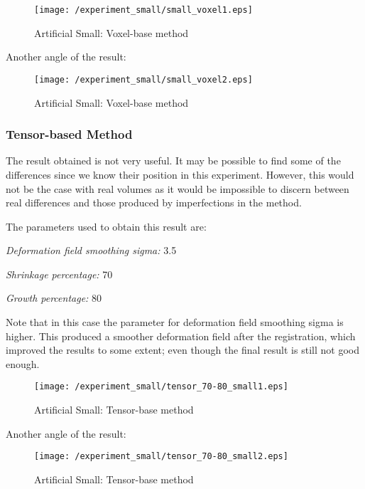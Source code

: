 \begin{figure}[H]
  \centering
  \texttt{[image: /experiment\_small/small\_voxel1.eps]}
  \caption{Artificial Small: Voxel-base method}
  \label{voxel_small1}
\end{figure}

Another angle of the result:

\begin{figure}[H]
  \centering
  \texttt{[image: /experiment\_small/small\_voxel2.eps]}
  \caption{Artificial Small: Voxel-base method}
  \label{voxel_small2}
\end{figure}


\subsubsection{Tensor-based Method}
The result obtained is not very useful. It may be possible to find
some of the differences since we know their position in this
experiment. However, this would not be the case with real volumes as
it would be impossible to discern between real differences and those
produced by imperfections in the method.

The parameters used to obtain this result are:
\begin{description}
\item \textit{Deformation field smoothing sigma:} 3.5
\item \textit{Shrinkage percentage:} 70
\item \textit{Growth percentage:} 80
\end{description}

Note that in this case the parameter for deformation field smoothing
sigma is higher. This produced a smoother deformation field after the
registration, which improved the results to some extent; even though
the final result is still not good enough.

\begin{figure}[H]
  \centering
  \texttt{[image: /experiment\_small/tensor\_70-80\_small1.eps]}
  \caption{Artificial Small: Tensor-base method}
  \label{tensor_small1}
\end{figure}

Another angle of the result:

\begin{figure}[H]
  \centering
  \texttt{[image: /experiment\_small/tensor\_70-80\_small2.eps]}
  \caption{Artificial Small: Tensor-base method}
  \label{tensor_small2}
\end{figure}

